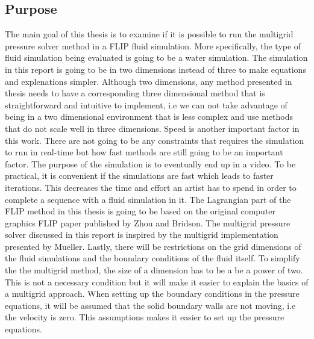 \subsection{Purpose}

The main goal of this thesis is to examine if it is possible to run the multigrid pressure solver method in a FLIP fluid simulation. More specifically, the type of fluid simulation being evaluated is going to be a water simulation. The simulation in this report is going to be in two dimensions instead of three to make equations and explenations simpler. Although two dimensions, any method presented in thesis needs to have a corresponding three dimensional method that is straightforward and intuitive to implement, i.e we can not take advantage of being in a two dimensional environment that is less complex and use methods that do not scale well in three dimensions. 
\newline
\newline 
Speed is another important factor in this work. There are not going to be any constraints that requires the simulation to run in real-time but how fast methods are still going to be an important factor. The purpose of the simulation is to eventually end up in a video. To be practical, it is convenient if the simulations are fast which leads to faster iterations. This decreases the time and effort an artist has to spend in order to complete a sequence with a fluid simulation in it.
\newline
\newline
The Lagrangian part of the FLIP method in this thesis is going to be based on the original computer graphics FLIP paper published by Zhou and Bridson\cite{zhu}. The multigrid pressure solver discussed in this report is inspired by the multigrid implementation presented by Mueller\cite{mueller}.
\newline
\newline
Lastly, there will be restrictions on the grid dimensions of the fluid simulations and the boundary conditions of the fluid itself. To simplify the the multigrid method, the size of a dimension has to be a be a power of two. This is not a necessary condition but it will make it easier to explain the basics of a multigrid approach. When setting up the boundary conditions in the pressure equations, it will be assumed that the solid boundary walls are not moving, i.e the velocity is zero. This assumptions makes it easier to set up the pressure equations.
